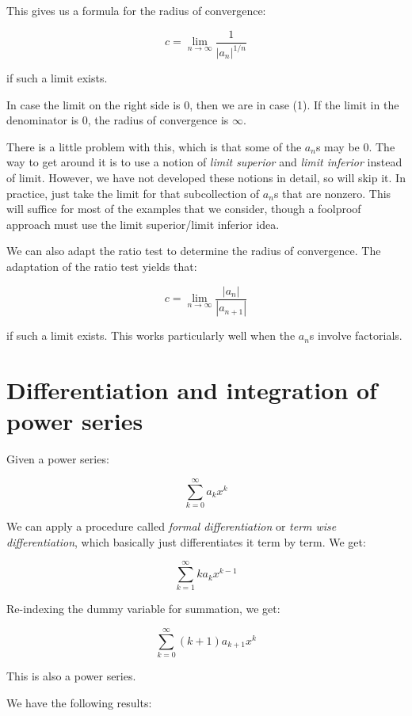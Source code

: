 \documentclass{amsart}
\begin{document}
This gives us a formula for the radius of convergence:

$$c = \lim_{n \to \infty} \frac{1}{|a_n|^{1/n}}$$

if such a limit exists.

In case the limit on the right side is $0$, then we are in case
(1). If the limit in the denominator is $0$, the radius of convergence
is $\infty$.

There is a little problem with this, which is that some of the $a_n$s
may be $0$. The way to get around it is to use a notion of {\em limit
superior} and {\em limit inferior} instead of limit. However, we have
not developed these notions in detail, so will skip it. In practice,
just take the limit for that subcollection of $a_n$s that are
nonzero. This will suffice for most of the examples that we consider,
though a foolproof approach must use the limit superior/limit inferior
idea.

We can also adapt the ratio test to determine the radius of
convergence. The adaptation of the ratio test yields that:

$$c = \lim_{n \to \infty} \frac{|a_n|}{|a_{n+1}|}$$

if such a limit exists. This works particularly well when the $a_n$s
involve factorials.

\section{Differentiation and integration of power series}

Given a power series:

$$\sum_{k=0}^\infty a_kx^k$$

We can apply a procedure called {\em formal differentiation} or {\em
term wise differentiation}, which basically just differentiates it
term by term. We get:

$$\sum_{k=1}^\infty ka_kx^{k-1}$$

Re-indexing the dummy variable for summation, we get:

$$\sum_{k=0}^\infty (k+1)a_{k+1}x^k$$

This is also a power series.

We have the following results:
\end{document}
